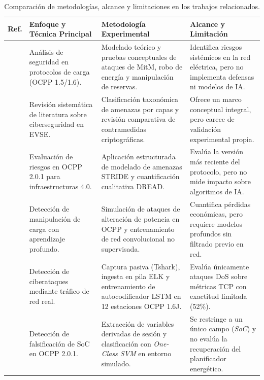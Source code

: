 \documentclass[conference]{IEEEtran}
\begin{document}
\begin{table}[t]
\centering
\caption{Comparación de metodologías, alcance y limitaciones en los trabajos relacionados.}
\label{tab:relacionados}
\footnotesize
\setlength{\tabcolsep}{4pt}
\begin{tabularx}{\textwidth}{c >{\raggedright\arraybackslash\hspace{0pt}}p{4.2cm} >{\raggedright\arraybackslash\hspace{0pt}}X >{\raggedright\arraybackslash\hspace{0pt}}p{4.3cm}}
\toprule
\textbf{Ref.} & \textbf{Enfoque y Técnica Principal} & \textbf{Metodología Experimental} & \textbf{Alcance y Limitación} \\
\midrule
\cite{alcaraz2017} & Análisis de seguridad en protocolos de carga (OCPP 1.5/1.6). & Modelado teórico y pruebas conceptuales de ataques de MitM, robo de energía y manipulación de reservas. & Identifica riesgos sistémicos en la red eléctrica, pero no implementa defensas ni modelos de IA. \\
\addlinespace
\cite{garofalaki2022} & Revisión sistemática de literatura sobre ciberseguridad en EVSE. & Clasificación taxonómica de amenazas por capas y revisión comparativa de contramedidas criptográficas. & Ofrece un marco conceptual integral, pero carece de validación experimental propia. \\
\addlinespace
\cite{alcaraz2023} & Evaluación de riesgos en OCPP 2.0.1 para infraestructuras 4.0. & Aplicación estructurada de modelado de amenazas STRIDE y cuantificación cualitativa DREAD. & Evalúa la versión más reciente del protocolo, pero no mide impacto sobre algoritmos de IA. \\
\addlinespace
\cite{jahangir2024} & Detección de manipulación de carga con aprendizaje profundo. & Simulación de ataques de alteración de potencia en OCPP y entrenamiento de red convolucional no supervisada. & Cuantifica pérdidas económicas, pero requiere modelos profundos sin filtrado previo en red. \\
\addlinespace
\cite{terruggia2025} & Detección de ciberataques mediante tráfico de red real. & Captura pasiva (Tshark), ingesta en pila ELK y entrenamiento de autocodificador LSTM en 12 estaciones OCPP 1.6J. & Evalúa únicamente ataques DoS sobre métricas TCP con exactitud limitada (52\%). \\
\addlinespace
\cite{rahman2026} & Detección de falsificación de SoC en OCPP 2.0.1. & Extracción de variables derivadas de sesión y clasificación con \textit{One-Class SVM} en entorno simulado. & Se restringe a un único campo (\textit{SoC}) y no evalúa la recuperación del planificador energético. \\

\end{tabularx}
\end{table}
\end{document}

